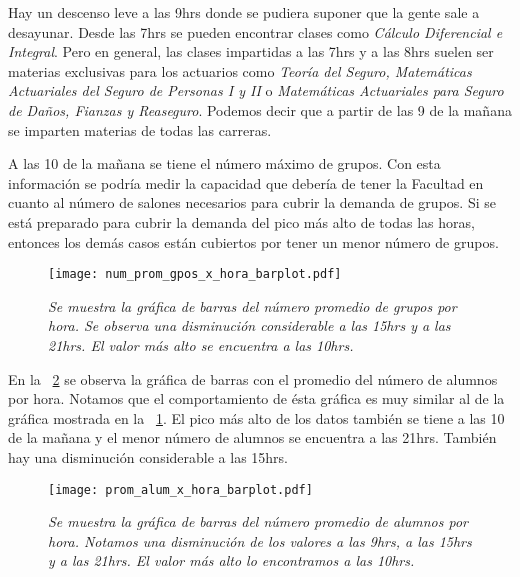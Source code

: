 Hay un descenso leve a las 9hrs donde se pudiera suponer que la gente sale a desayunar. Desde las 7hrs se pueden encontrar clases como \textit{Cálculo Diferencial e Integral}. Pero en general, las clases impartidas a las 7hrs y a las 8hrs suelen ser materias exclusivas para los actuarios como \textit{Teoría del Seguro, Matemáticas Actuariales del Seguro de Personas I y II} o \textit{Matemáticas Actuariales para Seguro de Daños, Fianzas y Reaseguro}. Podemos decir que a partir de las 9 de la mañana se imparten materias de todas las carreras.


A las 10 de la mañana se tiene el número máximo de grupos. Con esta información se podría medir la capacidad que debería de tener la Facultad en cuanto al número de salones necesarios para cubrir la demanda de grupos. Si se está preparado para cubrir la demanda del pico más alto de todas las horas, entonces los demás casos están cubiertos por tener un menor número de grupos.


\begin{figure}[H]
\centering
\texttt{[image: num\_prom\_gpos\_x\_hora\_barplot.pdf]} %
\caption[\textit{Número promedio de grupos por hora}]{\textit{Se muestra la gráfica de barras del número promedio de grupos por hora. Se observa una disminución considerable a las 15hrs y a las 21hrs. El valor más alto se encuentra a las 10hrs.}}\label{num_prom_gpos_x_hora_barplot}
\end{figure}

En la \figurename{~\ref{prom_alum_x_hora_barplot}} se observa la gráfica de barras con el promedio del número de alumnos por hora. Notamos que el comportamiento de ésta gráfica es muy similar al de la gráfica mostrada en la \figurename{~\ref{num_prom_gpos_x_hora_barplot}}. El pico más alto de los datos también se tiene a las 10 de la mañana y el menor número de alumnos se encuentra a las 21hrs. También hay una disminución considerable a las 15hrs.

\begin{figure}[H]
\centering
\texttt{[image: prom\_alum\_x\_hora\_barplot.pdf]} %
\caption[\textit{Número promedio de alumnos por hora}]{\textit{Se muestra la gráfica de barras del número promedio de alumnos por hora. Notamos una disminución de los valores a las 9hrs, a las 15hrs y a las 21hrs. El valor más alto lo encontramos a las 10hrs.}}\label{prom_alum_x_hora_barplot}
\end{figure}

